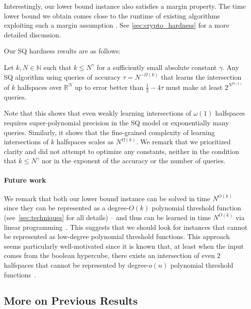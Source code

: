 \documentclass{theoretics}
\newcommand{\N}{\mathbb N}
\newcommand{\R}{\mathbb R}
\renewcommand{\leq}{\leqslant}
\begin{document}
Interestingly, our lower bound instance also satisfies a margin property.
The time lower bound we obtain comes close to the runtime of existing algorithms exploiting such a margin assumption \cite{learning_intersections_margins}.
See \cref{sec:crypto_hardness} for a more detailed discussion.

Our SQ hardness results are as follows:
\begin{theorem}
    \label{thm:sq_intro}
    Let $k,N \in \N$ such that $k \leq N^\gamma$ for a sufficiently small absolute constant $\gamma$.
    Any SQ algorithm using queries of accuracy $\tau = N^{-\Omega(k)}$ that learns the intersection of $k$ halfspaces over $\R^N$ up to error better than $\tfrac 1 2 - 4\tau$ must make at least $2^{N^{\Omega(1)}}$ queries.
\end{theorem}
Note that this shows that even weakly learning intersections of $\omega(1)$ halfspaces requires super-polynomial precision in the SQ model or exponentially many queries.
Similarly, it shows that the fine-grained complexity of learning intersections of $k$ halfspaces scales as $N^{\Omega(k)}$.
We remark that we prioritized clarity and did not attempt to optimize any constants, neither in the condition that $k \leq N^\gamma$ nor in the exponent of the accuracy or the number of queries.

\paragraph{Future work}

We remark that both our lower bound instance can be solved in time $N^{O(k)}$ since they can be represented as a degree-$O(k)$ polynomial threshold function (see~\cref{sec:techniques} for all details) -- and thus can be learned in time $N^{O(k)}$ via linear programming~\cite{maass1994fast}.
This suggests that we should look for instances that cannot be represented as low-degree polynomial threshold functions.
This approach seems particularly well-motivated since it is known that, at least when the input comes from the boolean hypercube, there exists an intersection of even 2 halfspaces that cannot be represented by degree-$o(n)$ polynomial threshold functions~\cite{sherstov2010optimal,sherstov2021hardest}.

\subsection{More on Previous Results}
\label{sec:relation_prev_work}
\end{document}
